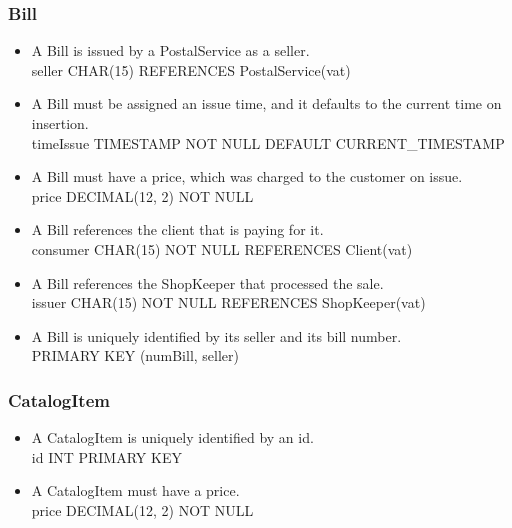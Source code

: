 \documentclass{report}[a4paper]
\theoremstyle{remark}
\begin{document}
\subsubsection{Bill}
\begin{itemize}
    \item A Bill is issued by a PostalService as a seller. \\ seller CHAR(15) REFERENCES PostalService(vat)
    \item A Bill must be assigned an issue time, and it defaults to the current time on insertion. \\ timeIssue TIMESTAMP NOT NULL DEFAULT CURRENT\_TIMESTAMP
    \item A Bill must have a price, which was charged to the customer on issue. \\ price DECIMAL(12, 2) NOT NULL
    \item A Bill references the client that is paying for it. \\ consumer CHAR(15) NOT NULL REFERENCES Client(vat)
    \item A Bill references the ShopKeeper that processed the sale. \\ issuer CHAR(15) NOT NULL REFERENCES ShopKeeper(vat)
    \item A Bill is uniquely identified by its seller and its bill number. \\ PRIMARY KEY (numBill, seller)
\end{itemize}
\subsubsection{CatalogItem}
\begin{itemize}
    \item A CatalogItem is uniquely identified by an id. \\ id INT PRIMARY KEY
    \item A CatalogItem must have a price. \\ price DECIMAL(12, 2) NOT NULL
\end{itemize}
\end{document}
